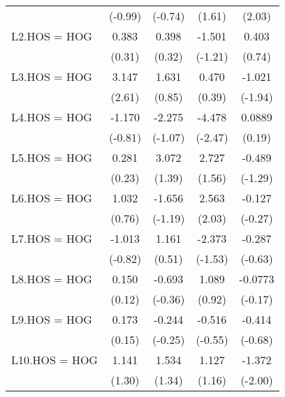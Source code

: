 {\begin{longtable}{l*{4}{c}}
                &  (-0.99)         &  (-0.74)         &   (1.61)         &   (2.03)         \\
[1em]
L2.HOS = HOG    &    0.383         &    0.398         &   -1.501         &    0.403         \\
                &   (0.31)         &   (0.32)         &  (-1.21)         &   (0.74)         \\
[1em]
L3.HOS = HOG    &    3.147\sym{**} &    1.631         &    0.470         &   -1.021         \\
                &   (2.61)         &   (0.85)         &   (0.39)         &  (-1.94)         \\
[1em]
L4.HOS = HOG    &   -1.170         &   -2.275         &   -4.478\sym{*}  &   0.0889         \\
                &  (-0.81)         &  (-1.07)         &  (-2.47)         &   (0.19)         \\
[1em]
L5.HOS = HOG    &    0.281         &    3.072         &    2.727         &   -0.489         \\
                &   (0.23)         &   (1.39)         &   (1.56)         &  (-1.29)         \\
[1em]
L6.HOS = HOG    &    1.032         &   -1.656         &    2.563\sym{*}  &   -0.127         \\
                &   (0.76)         &  (-1.19)         &   (2.03)         &  (-0.27)         \\
[1em]
L7.HOS = HOG    &   -1.013         &    1.161         &   -2.373         &   -0.287         \\
                &  (-0.82)         &   (0.51)         &  (-1.53)         &  (-0.63)         \\
[1em]
L8.HOS = HOG    &    0.150         &   -0.693         &    1.089         &  -0.0773         \\
                &   (0.12)         &  (-0.36)         &   (0.92)         &  (-0.17)         \\
[1em]
L9.HOS = HOG    &    0.173         &   -0.244         &   -0.516         &   -0.414         \\
                &   (0.15)         &  (-0.25)         &  (-0.55)         &  (-0.68)         \\
[1em]
L10.HOS = HOG   &    1.141         &    1.534         &    1.127         &   -1.372\sym{*}  \\
                &   (1.30)         &   (1.34)         &   (1.16)         &  (-2.00)         \\

\end{longtable}}
